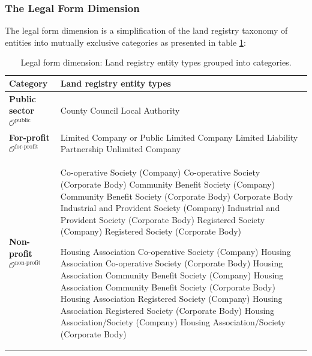 \documentclass[12pt]{article}
\begin{document}
\subsubsection{The Legal Form Dimension}
The legal form dimension is a simplification of the land registry taxonomy of entities into mutually exclusive categories as presented in table \ref{tab:legal_form_dimension}:
\begin{table}[!htbp]
\centering
\caption{Legal form dimension: Land registry entity types grouped into categories.}
\label{tab:legal_form_dimension}
\begin{tabular}{@{} p{} >{\raggedright\arraybackslash}p{} @{}}
\toprule
\textbf{Category} & \textbf{Land registry entity types} \\
\midrule

\textbf{Public sector}\newline
\(\mathcal{O}^{\text{public}}\) & 
County Council\newline
Local Authority \\
\midrule
\textbf{For-profit}\newline
\(\mathcal{O}^{\text{for-profit}}\) & 
Limited Company or Public Limited Company\newline
Limited Liability Partnership\newline
Unlimited Company \\
\midrule
\textbf{Non-profit}\newline
\(\mathcal{O}^{\text{non-profit}}\) & 
Co-operative Society (Company)\newline
Co-operative Society (Corporate Body)\newline
Community Benefit Society (Company)\newline
Community Benefit Society (Corporate Body)\newline
Corporate Body\newline
Industrial and Provident Society (Company)\newline
Industrial and Provident Society (Corporate Body)\newline
Registered Society (Company)\newline
Registered Society (Corporate Body)
\par\vspace{0.8em} %
Housing Association Co-operative Society (Company)\newline
Housing Association Co-operative Society (Corporate Body)\newline
Housing Association Community Benefit Society (Company)\newline
Housing Association Community Benefit Society (Corporate Body)\newline
Housing Association Registered Society (Company)\newline
Housing Association Registered Society (Corporate Body)\newline
Housing Association/Society (Company)\newline
Housing Association/Society (Corporate Body) \\


\end{tabular}
\end{table}
\end{document}
